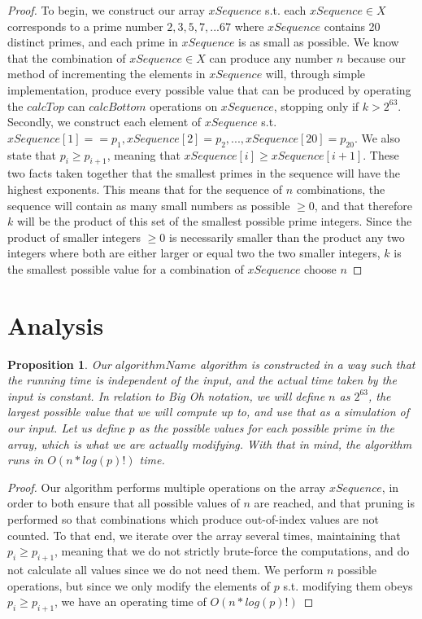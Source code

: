 \documentclass[12pt]{article}
\newtheorem{proposition}[theorem]{Proposition}
\begin{document}
\begin{proof}
To begin, we construct our array $xSequence$ s.t. each $xSequence \in X$ corresponds to a prime number ${2, 3, 5, 7, ... 67}$ where $xSequence$ contains 20 distinct primes, and each prime in $xSequence$ is as small as possible. We know that the combination of $xSequence \in X$ can produce any number $n$ because our method of incrementing the elements in $xSequence$ will, through simple implementation, produce every possible value that can be produced by operating the $calcTop$ can $calcBottom$ operations on $xSequence$, stopping only if $k > 2^{63}$. Secondly, we construct each element of $xSequence$ s.t. $xSequence[1] == p_1, xSequence[2] = p_2, ... ,xSequence[20] = p_{20}$. We also state that $p_i \geq p_{i+1}$, meaning that $xSequence[i] \geq xSequence[i+1]$. These two facts taken together that the smallest primes in the sequence will have the highest exponents. This means that for the sequence of $n$ combinations, the sequence will contain as many small numbers as possible $\geq 0$, and that therefore $k$ will be the product of this set of the smallest possible prime integers. Since the product of smaller integers $\geq 0$ is necessarily smaller than the product any two integers where both are either larger or equal two the two smaller integers, $k$ is the smallest possible value for a combination of $xSequence$ choose $n$
\end{proof}

\section{Analysis}

\begin{proposition}
\label{numq}
Our $algorithmName$ algorithm is constructed in a way such that the running time is independent of the input, and the actual time taken by the input is constant. In relation to Big Oh notation, we will define $n$ as $2^{63}$, the largest possible value that we will compute up to, and use that as a simulation of our input. Let us define $p$ as the possible values for each possible prime in the array, which is what we are actually modifying. With that in mind, the algorithm runs in $O(n \ast log(p)!)$ time.
\end{proposition}

\begin{proof}
    Our algorithm performs multiple operations on the array $xSequence$, in order to both ensure that all possible values of $n$ are reached, and that pruning is performed so that combinations which produce out-of-index values are not counted. To that end, we iterate over the array several times, maintaining that $p_i \geq p_{i+1}$, meaning that we do not strictly brute-force the computations, and do not calculate all values since we do not need them.  We perform $n$ possible operations, but since we only modify the elements of $p$ s.t. modifying them obeys $p_i \geq p_{i+1}$, we have an operating time of $O(n \ast log(p)!)$
\end{proof} %
\end{document}

